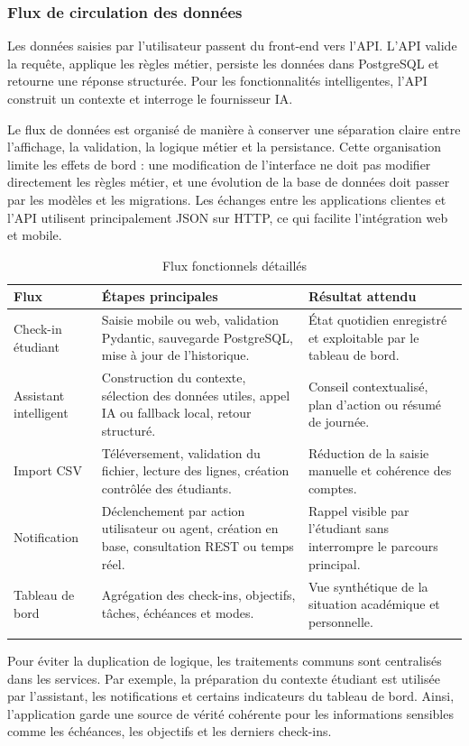\documentclass{rapportENSET}
\begin{document}
\subsubsection{Flux de circulation des données}
Les données saisies par l'utilisateur passent du front-end vers l'API. L'API valide la requête, applique les règles métier, persiste les données dans PostgreSQL et retourne une réponse structurée. Pour les fonctionnalités intelligentes, l'API construit un contexte et interroge le fournisseur IA.

Le flux de données est organisé de manière à conserver une séparation claire entre l'affichage, la validation, la logique métier et la persistance. Cette organisation limite les effets de bord : une modification de l'interface ne doit pas modifier directement les règles métier, et une évolution de la base de données doit passer par les modèles et les migrations. Les échanges entre les applications clientes et l'API utilisent principalement JSON sur HTTP, ce qui facilite l'intégration web et mobile.

\begin{longtable}{@{}L{0.24\textwidth}L{0.34\textwidth}L{0.32\textwidth}@{}}
\toprule
\textbf{Flux} & \textbf{Étapes principales} & \textbf{Résultat attendu} \\
\midrule
\endhead
Check-in étudiant & Saisie mobile ou web, validation Pydantic, sauvegarde PostgreSQL, mise à jour de l'historique. & État quotidien enregistré et exploitable par le tableau de bord. \\
Assistant intelligent & Construction du contexte, sélection des données utiles, appel IA ou fallback local, retour structuré. & Conseil contextualisé, plan d'action ou résumé de journée. \\
Import CSV & Téléversement, validation du fichier, lecture des lignes, création contrôlée des étudiants. & Réduction de la saisie manuelle et cohérence des comptes. \\
Notification & Déclenchement par action utilisateur ou agent, création en base, consultation REST ou temps réel. & Rappel visible par l'étudiant sans interrompre le parcours principal. \\
Tableau de bord & Agrégation des check-ins, objectifs, tâches, échéances et modes. & Vue synthétique de la situation académique et personnelle. \\
\bottomrule
\caption{Flux fonctionnels détaillés}
\end{longtable}

Pour éviter la duplication de logique, les traitements communs sont centralisés dans les services. Par exemple, la préparation du contexte étudiant est utilisée par l'assistant, les notifications et certains indicateurs du tableau de bord. Ainsi, l'application garde une source de vérité cohérente pour les informations sensibles comme les échéances, les objectifs et les derniers check-ins.
\end{document}
